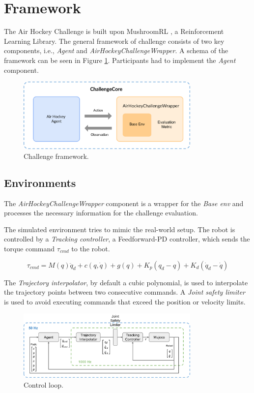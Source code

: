 \section{Framework}
The Air Hockey Challenge is built upon MushroomRL \cite{mushroom_rl}, a Reinforcement Learning Library.
The general framework of challenge consists of two key components, i.e., \textit{Agent} and \textit{AirHockeyChallengeWrapper}.
A schema of the framework can be seen in Figure \ref{fig:framework}.
Participants had to implement the \textit{Agent} component.

\begin{figure}[H]
    \centering
    \includegraphics[width=0.8\textwidth]{Images/framework.png}
    \caption{Challenge framework.}
    \label{fig:framework}
\end{figure}

\subsection{Environments}
    The \textit{AirHockeyChallengeWrapper} component is a wrapper for the \textit{Base env} and processes the necessary information for the challenge evaluation.

    The simulated environment tries to mimic the real-world setup. The robot is controlled by a \textit{Tracking controller}, a Feedforward-PD controller, which sends 
    the torque command $\tau_{cmd}$ to the robot.

    \begin{equation*}
        \tau_{cmd} = M(q)\ddot{q}_d + c(q,\dot{q}) + g(q) + K_p(q_d - q) + K_d(\dot{q}_d - \dot{q})
    \end{equation*}

    The \textit{Trajectory interpolator}, by default a cubic polynomial, is used to interpolate the trajectory points between two consecutive commands.
    A \textit{Joint safety limiter} is used to avoid executing commands that exceed the position or velocity limits.

    \begin{figure}[H]
        \centering
        \label{fig:control_loop}
        \includegraphics[width=0.8\textwidth]{Images/control_paradigm}
        \caption{Control loop.}

    \end{figure}

